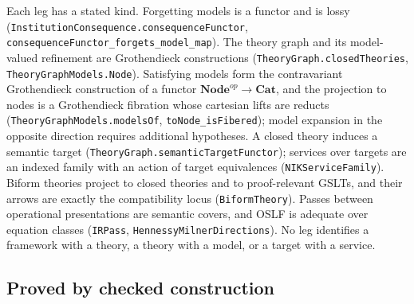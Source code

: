 \documentclass[11pt]{article}
\theoremstyle{definition}
\theoremstyle{remark}
\begin{document}
Each leg has a stated kind.  Forgetting models is a functor and is lossy
(\nolinkurl{InstitutionConsequence.consequenceFunctor},
\nolinkurl{consequenceFunctor_forgets_model_map}).  The theory graph and its
model-valued refinement are Grothendieck constructions
(\nolinkurl{TheoryGraph.closedTheories}, \nolinkurl{TheoryGraphModels.Node}).
Satisfying models form the contravariant Grothendieck construction of a
functor $\mathbf{Node}^{op}\to\mathbf{Cat}$, and the projection to nodes is
a Grothendieck fibration whose cartesian lifts are reducts
(\nolinkurl{TheoryGraphModels.modelsOf}, \texttt{toNode\_isFibered}); model
expansion in the opposite direction requires additional hypotheses.
A closed theory induces a semantic target
(\nolinkurl{TheoryGraph.semanticTargetFunctor}); services over targets are an
indexed family with an action of target equivalences
(\texttt{NIKServiceFamily}).  Biform theories project to closed theories and
to proof-relevant GSLTs, and their arrows are exactly the compatibility
locus (\texttt{BiformTheory}).  Passes between operational presentations are
semantic covers, and OSLF is adequate over equation classes
(\texttt{IRPass}, \nolinkurl{HennessyMilnerDirections}).  No leg identifies a
framework with a theory, a theory with a model, or a target with a service.

\subsection{Proved by checked construction}
\end{document}

